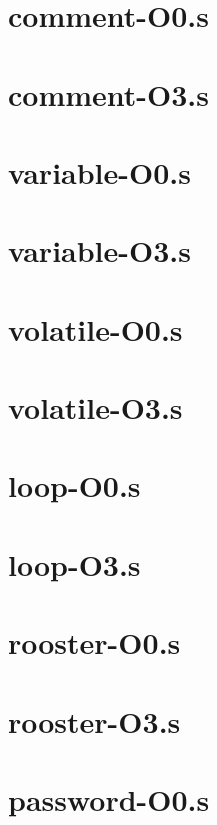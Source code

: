 \begin{appendices}
\section{comment-O0.s}

\section{comment-O3.s}


\section{variable-O0.s}

\section{variable-O3.s}


\section{volatile-O0.s}

\section{volatile-O3.s}


\section{loop-O0.s}

\section{loop-O3.s}


\section{rooster-O0.s}

\section{rooster-O3.s}


\section{password-O0.s}


\end{appendices}
